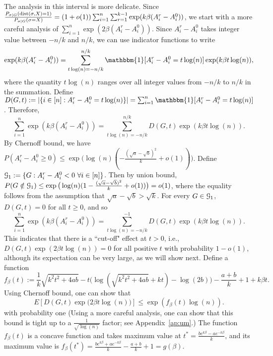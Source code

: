 \documentclass{article}
\begin{document}
The analysis in this interval is more delicate. Since $\frac{P_{\sigma|G} ( \operatorname{dist}(\sigma, X) = 1 )}{P_{\sigma|G}(\sigma= X)} 
= (1+o(1)) \sum_{i=1}^n \sum_{r=1}^{k-1}\exp (k\beta (A^r_i-A^0_i))$, we start with a more careful analysis of $\sum_{i=1}^n \exp (2 \beta (A^r_i-A^0_i))$.
Since $A^r_i-A^0_i$ takes integer value between $-n/k$ and $n/k$,
we can use indicator functions to write
\begin{align*}
 \exp (k \beta (A^r_i-A^0_i))
=  \sum_{t\log(n)=-n/k}^{n/k}
\mathbbm{1}[A^r_i-A^0_i=t \log(n)] \exp (k\beta t \log(n) ) ,
\end{align*}
where the quantity $t\log(n)$ ranges over all integer values from $-n/k$ to $n/k$ in the summation.
Define $D(G,t):=|\{i\in[n]:A^r_i-A^0_i= t\log(n)\}|=\sum_{i=1}^n \mathbbm{1}[A^r_i-A^0_i=t \log(n)]$.
Therefore,
\begin{equation}  \label{eq:gour}
 \sum_{i=1}^n \exp (k \beta (A^r_i-A^0_i))
=  \sum_{t\log(n)=-n/k}^{n/k}
D(G,t) \exp (k\beta t \log(n) ) .
\end{equation}
By Chernoff bound, we have $P(A^r_i-A^0_i\ge 0)\le \exp\big(\log(n)(-\frac{(\sqrt{a}-\sqrt{b})^2}{k} +o(1)) \big)$.
Define $\mathcal{G}_1:=\{G:A^r_i-A^0_i< 0~\forall i\in[n]\}$. Then by union bound, $P(G\notin\mathcal{G}_1)\le\exp\big(\log(n)(1-\frac{(\sqrt{a}-\sqrt{b})^2}{k} +o(1)) \big) = o(1)$, where the equality follows from the assumption that $\sqrt{a}-\sqrt{b}>\sqrt{k}$.
For every $G\in\mathcal{G}_1$, $D(G,t)=0$ for all $t\ge 0$, and so
\begin{equation} \label{eq:duj}
 \sum_{i=1}^n \exp (k \beta (A^r_i-A^0_i))
=  \sum_{t\log(n)=-n/k}^{-1}
D(G,t) \exp (k\beta t \log(n) ) .
\end{equation}
This indicates that there is a ``cut-off" effect at $t>0$, i.e., $D(G,t) \exp (2\beta t \log(n) )=0$ for all positive $t$ with probability $1-o(1)$, although its expectation can be very large, as we will show next.
Define a function
$$
f_{\beta}(t):=\frac{1}{k}\sqrt{k^2t^2+4ab} -t\big(\log(\sqrt{k^2t^2+4ab}+kt)-\log(2b) \big) -\frac{a+b}{k} +1 +k\beta t.
$$
Using Chernoff bound, one can show that 
$$
E[D(G,t)
\exp\big(2\beta t \log(n) \big)]
\le \exp( f_{\beta}(t) \log(n) ) .
$$
with probability one (Using a more careful analysis, one can show that this bound is tight up to a $\frac{1}{\sqrt{\log(n)}}$ factor; see Appendix~\ref{ap:um}.)
The function $f_{\beta}(t)$ is a concave function and takes maximum value at $t^\ast=\frac{b e^{k\beta}-a e^{-k\beta}}{k}$, and its maximum value is $f_{\beta}(t^\ast)=\frac{b e^{k\beta}+a e^{-k\beta}}{k}-\frac{a+b}{k}+1
=g(\beta)$.
\end{document}
